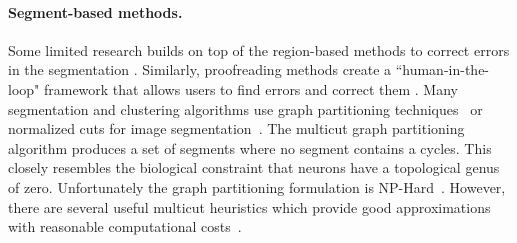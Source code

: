 \paragraph{Segment-based methods.} 

Some limited research builds on top of the region-based methods to correct errors in the segmentation \cite{rolnick2017morphological,error_correction_using_CNN}.
Similarly, proofreading methods create a ``human-in-the-loop" framework that allows users to find errors and correct them \cite{haehn2017scalable,haehn2017guided,haehn2014design}. 
Many segmentation and clustering algorithms use graph partitioning techniques~\cite{andres2012globally} or normalized cuts for image segmentation~\cite{kappes2016higher,shi2000normalized,tatiraju2008image}. 
The multicut graph partitioning algorithm produces a set of segments where no segment contains a cycles.
This closely resembles the biological constraint that neurons have a topological genus of zero. 
Unfortunately the graph partitioning formulation is NP-Hard~\cite{demaine2006correlation}.
However, there are several useful multicut heuristics which provide good approximations with reasonable computational costs~\cite{horvnakova2017analysis,kernighan1970efficient,keuper2015efficient}.

